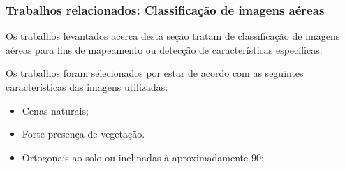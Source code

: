 \documentclass[t]{beamer}
\begin{document}
%
%
%
%
%
%

\begin{frame}[c]
	\frametitle{Trabalhos relacionados: Classificação de imagens aéreas}

	Os trabalhos levantados acerca desta seção tratam de classificação de imagens aéreas para fins de mapeamento ou detecção de características específicas. 

	\vspace{0.5cm}

	Os trabalhos foram selecionados por estar de acordo com as seguintes características das imagens utilizadas:

	\begin{itemize}
		\item Cenas naturais;
		\item Forte presença de vegetação.
 		\item Ortogonais ao solo ou inclinadas à aproximadamente 90\degree;
	\end{itemize}
\end{frame}
\end{document}
